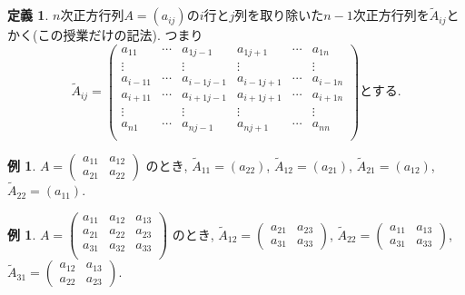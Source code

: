 \documentclass[dvipdfmx,a4paper,11pt]{article}
\theoremstyle{definition}
\newtheorem{dfn}[thm]{定義}
\newtheorem{exa}[thm]{例}
\begin{document}
\begin{tcolorbox}[
    colback = white,
    colframe = green!35!black,
    fonttitle = \bfseries,
    breakable = true]
    \begin{dfn}
    $n$次正方行列$A=(a_{ij})$の$i$行と$j$列を取り除いた$n-1$次正方行列を$\tilde{A}_{ij}$とかく(この授業だけの記法). つまり
  $$
  \tilde{A}_{ij}
  =
    \begin{pmatrix}
a_{11}&   \cdots &a_{1j-1}&a_{1j+1}&\cdots&a_{1n} \\
\vdots&   		& \vdots &\vdots &   		&\vdots  \\
a_{i-11}&   \cdots &a_{i-1j-1}&a_{i-1j+1}&\cdots&a_{i-1n} \\
a_{i+11}&   \cdots &a_{i+1j-1}&a_{i+1j+1}&\cdots&a_{i+1n} \\
\vdots&   		& \vdots &\vdots &   		&\vdots  \\
a_{n1}&   \cdots &a_{nj-1}&a_{nj+1}&\cdots&a_{nn} \\
\end{pmatrix}
\text{とする.}
$$
    \end{dfn}
 \end{tcolorbox}
\begin{exa}
$A=
\begin{pmatrix}
a_{11} & a_{12} \\
a_{21} & a_{22}
\end{pmatrix}
$
のとき, 
$  \tilde{A}_{11} =(a_{22})$, $  \tilde{A}_{12} =(a_{21})$, $  \tilde{A}_{21} =(a_{12})$, $  \tilde{A}_{22} =(a_{11})$.
\end{exa}
\begin{exa}
$
A=
\begin{pmatrix}
a_{11} & a_{12}&a_{13} \\
a_{21} & a_{22}&a_{23} \\
a_{31} & a_{32}&a_{33} \\
\end{pmatrix}
$
のとき, 
$  \tilde{A}_{12} =
\begin{pmatrix}
a_{21} & a_{23} \\
a_{31} & a_{33}
\end{pmatrix}
$, 
$  \tilde{A}_{22} =
\begin{pmatrix}
a_{11} & a_{13} \\
a_{31} & a_{33}
\end{pmatrix}
$, 
$  \tilde{A}_{31} =
\begin{pmatrix}
a_{12} & a_{13} \\
a_{22} & a_{23}
\end{pmatrix}
$.
\end{exa}
\end{document}

